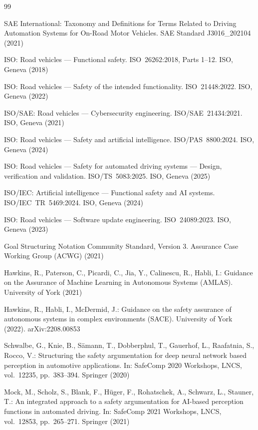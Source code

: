 \documentclass[runningheads]{llncs}
\newcommand{\new}[1]{#1}
\newcommand{\new}[1]{\textcolor{blue}{#1}}
\newcommand{\crev}[1]{\textcolor{blue!75!black}{#1}}
\newcommand{\crev}[1]{#1}
\begin{document}
	\begin{thebibliography}{99}
		
		SAE International: Taxonomy and Definitions for Terms Related to Driving Automation Systems for On-Road Motor Vehicles. SAE Standard J3016\_202104 (2021)
		
		ISO: Road vehicles --- Functional safety. ISO~26262:2018, Parts 1--12. ISO, Geneva (2018)
		
		ISO: Road vehicles --- Safety of the intended functionality. ISO~21448:2022. ISO, Geneva (2022)
		
		ISO/SAE: Road vehicles --- Cybersecurity engineering. ISO/SAE~21434:2021. ISO, Geneva (2021)
		
		ISO: Road vehicles --- Safety and artificial intelligence. ISO/PAS~8800:2024. ISO, Geneva (2024)
		
		\new{
			ISO: Road vehicles --- Safety for automated driving systems --- Design, verification and validation. ISO/TS~5083:2025. ISO, Geneva (2025)}
		
		ISO/IEC: Artificial intelligence --- Functional safety and AI systems. ISO/IEC~TR~5469:2024. ISO, Geneva (2024)
		
		\crev{ISO: Road vehicles --- Software update engineering. ISO~24089:2023. ISO, Geneva (2023)}
		
		{Goal Structuring Notation Community Standard}, Version 3. Assurance Case Working Group (ACWG) (2021)
		
		Hawkins, R., Paterson, C., Picardi, C., Jia, Y., Calinescu, R., Habli, I.: Guidance on the Assurance of Machine Learning in Autonomous Systems (AMLAS). University of York (2021)
		
		Hawkins, R., Habli, I., McDermid, J.: Guidance on the safety assurance of autonomous systems in complex environments (SACE). University of York (2022). arXiv:2208.00853
		
		Schwalbe, G., Knie, B., S\"amann, T., Dobberphul, T., Gauerhof, L., Raafatnia, S., Rocco, V.: Structuring the safety argumentation for deep neural network based perception in automotive applications. In: SafeComp 2020 Workshops, LNCS, vol.~12235, pp.~383--394. Springer (2020)
		
		Mock, M., Scholz, S., Blank, F., H\"uger, F., Rohatschek, A., Schwarz, L., Stauner, T.: An integrated approach to a safety argumentation for AI-based perception functions in automated driving. In: SafeComp 2021 Workshops, LNCS, vol.~12853, pp.~265--271. Springer (2021)
		

\end{thebibliography}
\end{document}
